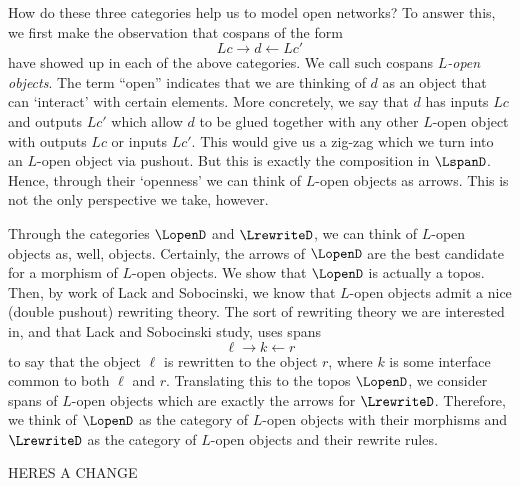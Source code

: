 \documentclass[reopn_master]{subfiles}
\begin{document}
How do these three categories help
us to model open networks?
To answer this, we first make the
observation that cospans of the form
\[
Lc \to d \gets Lc'
\]
have showed up in each of the above
categories. We call such cospans
\emph{$L$-open objects}.  The term ``open''
indicates that we are thinking of $d$ as 
an object that can `interact' with certain 
elements. More concretely, we say that $ d $ 
has inputs $Lc$ and outputs $ Lc' $ which allow
$ d $ to be glued together with any other
$ L $-open object with outputs $ Lc $ or 
inputs $ Lc' $.  This would give us a zig-zag
which we turn into an $ L $-open object
via pushout.  But this is exactly the composition
in $ \LspanD $. Hence, through their `openness' 
we can think of $ L $-open objects as arrows.
This is not the only perspective we take, however.

Through the categories $ \LopenD $ and $ \LrewriteD $,
we can think of $ L $-open objects as, well, objects.
Certainly, the arrows of $ \LopenD $ are the best
candidate for a morphism of $ L $-open objects.  
We show that $ \LopenD $ is actually a topos.
Then, by work of Lack and Sobocinski, we know that
$ L $-open objects admit a nice (double pushout)
rewriting theory. The sort of rewriting theory we are
interested in, and that Lack and Sobocinski study,
uses spans 
\[
\ell \to k \gets r
\]
to say that the object $ \ell $ is
rewritten to the object $ r $, where $ k $
is some interface common to both 
$ \ell $ and $ r $.  Translating this to the topos 
$ \LopenD $, we consider spans of $ L $-open objects
which are exactly the arrows for $ \LrewriteD $.
Therefore, we think of $ \LopenD $ as the
category of $ L $-open objects with their
morphisms and $ \LrewriteD $ as the category
of $ L $-open objects and their rewrite rules.  

HERES A CHANGE

\end{document}
